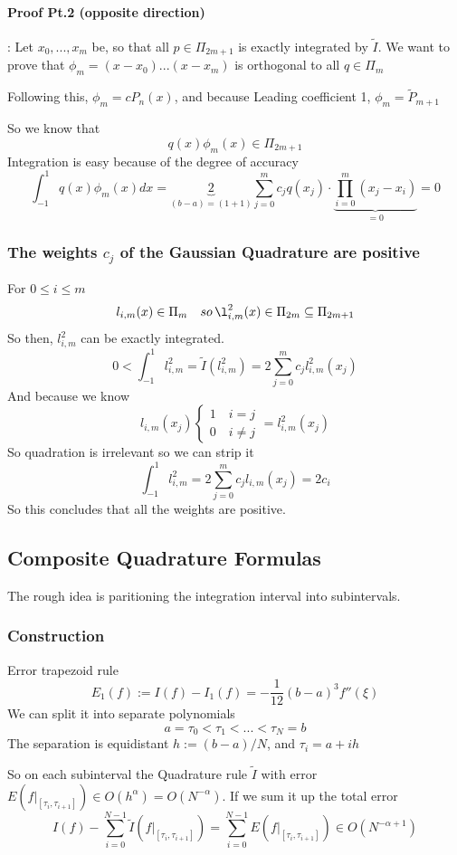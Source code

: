 \documentclass{article}
\begin{document}
\paragraph{Proof Pt.2 (opposite direction) }: Let $x_0,...,x_m$ be, so that all $p \in \Pi_{2m+1}$ is exactly integrated by $\tilde{I}$. We want to prove that $\phi_m = (x-x_0)...(x-x_m)$ is orthogonal to all $q\in\Pi_m$

Following this, $\phi_m = cP_n(x)$, and because Leading coefficient 1, $\phi_m = \tilde{P}_{m+1}$

So we know that 
\[q(x)\phi_m(x) \in \Pi_{2m+1}\]
Integration is easy because of the degree of accuracy
\[\int_{-1}^1 q(x)\phi_m(x)dx = \underbrace{2}_{(b-a) = (1+1)}\sum_{j=0}^m c_j q(x_j) \cdot \underbrace{\prod_{i=0}^m \left(x_j - x_i\right)}_{=0} = 0\]

\subsubsection{The weights $c_j$ of the Gaussian Quadrature are positive}
For $0 \leq i \leq m$
\[l_{i,m}(x) \in \Pi_m \quad so \, \l_{i,m}^2(x)\in \Pi_{2m} \subseteq \Pi_{2m+1}\]
So then, $l_{i,m}^2$ can be exactly integrated.
\[0 < \int_{-1}^1 l_{i,m}^2  = \tilde{I}(l_{i,m}^2) = 2\sum_{j=0}^m c_jl_{i,m}^2(x_j)\]
And because we know
\[l_{i,m}(x_j) \begin{cases}
  1 \quad i=j\\
  0 \quad i \neq j
\end{cases} = l_{i,m}^2(x_j)\]
So quadration is irrelevant so we can strip it
\[\int_{-1}^1 l_{i,m}^2= 2\sum_{j=0}^m c_jl_{i,m}(x_j) = 2c_i\]
So this concludes that all the weights are positive.

\subsection{Composite Quadrature Formulas}
The rough idea is paritioning the integration interval into subintervals.

\subsubsection{Construction}
Error trapezoid rule
\[E_1(f) := I(f) - I_1(f) = - \frac{1}{12}(b-a)^3f''(\xi)\]
We can split it into separate polynomials
\[a = \tau_0 < \tau_1 < ... <\tau_N = b\]
The separation is equidistant $h:= (b-a)/N$, and $\tau_i = a+ih$

So on each subinterval the Quadrature rule $\tilde{I}$ with error $E(f|_{[\tau_i,\tau_{i+1}]}) \in O(h^\alpha) = O(N^{-\alpha})$. If we sum it up the total error
\[I(f) - \sum_{i=0}^{N-1}\tilde{I}(f|_{[\tau_i,\tau_{i+1}]}) = \sum_{i=0}^{N-1}E(f|_{[\tau_i,\tau_{i+1}]}) \in O(N^{-\alpha + 1})\]
\end{document}
